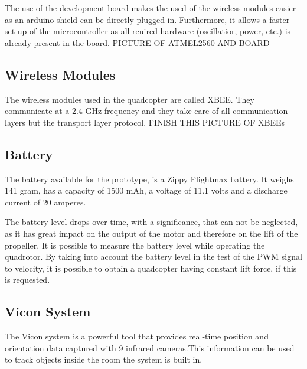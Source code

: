 The use of the development board makes the used of the wireless modules easier as an arduino shield can be directly plugged in. Furthermore, it allows a faster set up of the microcontroller as all reuired hardware (oscillatior, power, etc.) is already present in the board. 
PICTURE  OF ATMEL2560 AND BOARD
\subsection{Wireless Modules}
The wireless modules used in the quadcopter are called XBEE. They communicate at a 2.4 GHz frequency and they take care of all communication layers but the transport layer protocol. FINISH THIS
PICTURE OF XBEEs

\subsection{Battery}
The battery available for the prototype, is a Zippy Flightmax battery. It weighs 141 gram, has a capacity of 1500 mAh, a voltage of 11.1 volts and a discharge current of 20 amperes.

The battery level drops over time, with a significance, that can not be neglected, as it has great impact on the output of the motor and therefore on the lift of the propeller. It is possible to measure the battery level while operating the quadrotor. By taking into account the battery level in the test of the PWM signal to velocity, it is possible to obtain a quadcopter having constant lift force, if this is requested.

\subsection{Vicon System}
The Vicon system is a powerful tool that provides real-time position and orientation data captured with 9 infrared cameras.This information can be used to track objects inside the room the system is built in.


